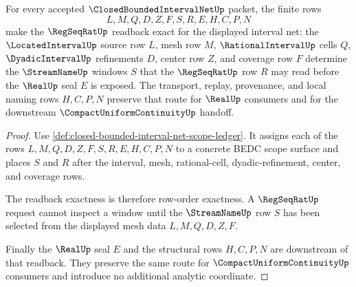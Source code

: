 \begin{theorem}
\label{thm:closed-bounded-interval-net-regseqrat-window-exactness}
For every accepted $\ClosedBoundedIntervalNetUp$ packet, the finite rows
$$
L,M,Q,D,Z,F,S,R,E,H,C,P,N
$$
make the $\RegSeqRatUp$ readback exact for the displayed interval net: the $\LocatedIntervalUp$ source row $L$, mesh row $M$, $\RationalIntervalUp$ cells $Q$, $\DyadicIntervalUp$ refinements $D$, center row $Z$, and coverage row $F$ determine the $\StreamNameUp$ windows $S$ that the $\RegSeqRatUp$ row $R$ may read before the $\RealUp$ seal $E$ is exposed. The transport, replay, provenance, and local naming rows $H,C,P,N$ preserve that route for $\RealUp$ consumers and for the downstream $\CompactUniformContinuityUp$ handoff.
\end{theorem}
\begin{proof}
Use \autoref{def:closed-bounded-interval-net-scope-ledger}. It assigns each of the rows $L,M,Q,D,Z,F,S,R,E,H,C,P,N$ to a concrete BEDC scope surface and places $S$ and $R$ after the interval, mesh, rational-cell, dyadic-refinement, center, and coverage rows.

The readback exactness is therefore row-order exactness. A $\RegSeqRatUp$ request cannot inspect a window until the $\StreamNameUp$ row $S$ has been selected from the displayed mesh data $L,M,Q,D,Z,F$.

Finally the $\RealUp$ seal $E$ and the structural rows $H,C,P,N$ are downstream of that readback. They preserve the same route for $\CompactUniformContinuityUp$ consumers and introduce no additional analytic coordinate.
\end{proof}

